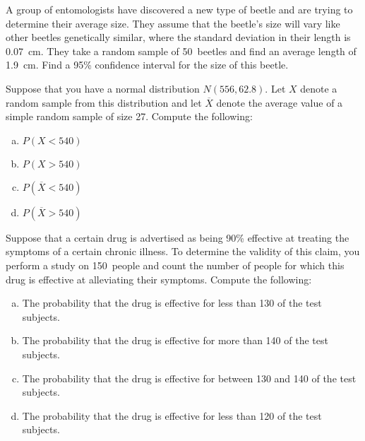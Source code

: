 \documentclass[11pt,letterpaper]{article}
\begin{document}

 A group of entomologists have discovered a new type of beetle and are trying to determine their average size. They assume that the beetle's size will vary like other beetles genetically similar, where the standard deviation in their length is 0.07~cm. They take a random sample of 50~beetles and find an average length of 1.9~cm. Find a 95\% confidence interval for the size of this beetle. 



\newpage



 Suppose that you have a normal distribution $N(556, 62.8)$. Let $X$ denote a random sample from this distribution and let $\overline{X}$ denote the average value of a simple random sample of size 27. Compute the following:
	\begin{enumerate}[(a)]
	\item $P(X < 540)$
	\item $P(X > 540)$
	\item $P(\overline{X} < 540)$
	\item $P(\overline{X} > 540)$
	\end{enumerate}



\newpage



 Suppose that a certain drug is advertised as being 90\% effective at treating the symptoms of a certain chronic illness. To determine the validity of this claim, you perform a study on 150~people and count the number of people for which this drug is effective at alleviating their symptoms. Compute the following:
	\begin{enumerate}[(a)]
	\item The probability that the drug is effective for less than 130 of the test subjects.
	\item The probability that the drug is effective for more than 140 of the test subjects.
	\item The probability that the drug is effective for between 130 and 140 of the test subjects.
	\item The probability that the drug is effective for less than 120 of the test subjects. 
	\end{enumerate}
\end{document}

